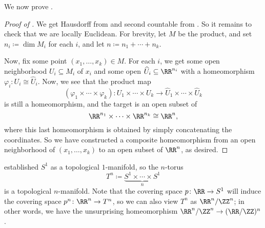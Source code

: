 \documentclass[../notes.tex]{subfiles}
\begin{document}
We now prove .
\begin{proof}[Proof of ]
	We get Hausdorff from  and second countable from . So it remains to check that we are locally Euclidean. For brevity, let $M$ be the product, and set $n_i\coloneqq\dim M_i$ for each $i$, and let $n\coloneqq n_1+\cdots+n_k$.

	Now, fix some point $(x_1,\ldots,x_k)\in M$. For each $i$, we get some open neighborhood $U_i\subseteq M_i$ of $x_i$ and some open $\widehat{U}_i\subseteq\RR^{n_i}$ with a homeomorphism $\varphi_i\colon U_i\cong\widehat U_i$. Now, we see that the product map
	\[(\varphi_1\times\cdots\times\varphi_k)\colon U_1\times\cdots\times U_k\to\widehat U_1\times\cdots\times\widehat U_k\]
	is still a homeomorphism, and the target is an open subset of
	\[\RR^{n_1}\times\cdots\times\RR^{n_k}\cong\RR^n,\]
	where this last homeomorphism is obtained by simply concatenating the coordinates. So we have constructed a composite homeomorphism from an open neighborhood of $(x_1,\ldots,x_k)$ to an open subset of $\RR^n$, as desired.
\end{proof}
\begin{example}
	 established $S^1$ as a topological $1$-manifold, so the $n$-torus
	\[T^n\coloneqq\underbrace{S^1\times\cdots\times S^1}_n\]
	is a topological $n$-manifold. Note that the covering space $p\colon\RR\to S^1$ will induce the covering space $p^n\colon\RR^n\to T^n$, so we can also view $T^n$ as $\RR^n/\ZZ^n$; in other words, we have the unsurprising homeomorphism $\RR^n/\ZZ^n\to(\RR/\ZZ)^n$.
\end{example}
\end{document}
